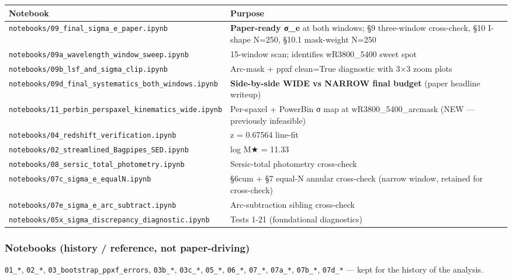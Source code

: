 \documentclass[
  10pt,
]{article}
\begin{document}
\begingroup\small\setlength{\tabcolsep}{4pt}\begin{longtable}[]{@{}ll@{}}
\toprule
Notebook & Purpose \\
\midrule
\endhead
\texttt{notebooks/09\_final\_sigma\_e\_paper.ipynb} & \textbf{Paper-ready σ\_e} at both windows; §9 three-window cross-check, §10 I-shape N=250, §10.1 mask-weight N=250 \\
\texttt{notebooks/09a\_wavelength\_window\_sweep.ipynb} & 15-window scan; identifies wR3800\_5400 sweet spot \\
\texttt{notebooks/09b\_lsf\_and\_sigma\_clip.ipynb} & Arc-mask + ppxf clean=True diagnostic with 3×3 zoom plots \\
\texttt{notebooks/09d\_final\_systematics\_both\_windows.ipynb} & \textbf{Side-by-side WIDE vs NARROW final budget} (paper headline writeup) \\
\texttt{notebooks/11\_perbin\_perspaxel\_kinematics\_wide.ipynb} & Per-spaxel + PowerBin σ map at wR3800\_5400\_arcmask (NEW --- previously infeasible) \\
\texttt{notebooks/04\_redshift\_verification.ipynb} & z = 0.67564 line-fit \\
\texttt{notebooks/02\_streamlined\_Bagpipes\_SED.ipynb} & log M★ = 11.33 \\
\texttt{notebooks/08\_sersic\_total\_photometry.ipynb} & Sersic-total photometry cross-check \\
\texttt{notebooks/07c\_sigma\_e\_equalN.ipynb} & §6cum + §7 equal-N annular cross-check (narrow window, retained for cross-check) \\
\texttt{notebooks/07e\_sigma\_e\_arc\_subtract.ipynb} & Arc-subtraction sibling cross-check \\
\texttt{notebooks/05x\_sigma\_discrepancy\_diagnostic.ipynb} & Tests 1-21 (foundational diagnostics) \\
\bottomrule
\end{longtable}\endgroup

\hypertarget{notebooks-history-reference-not-paper-driving}{%
\subsubsection{Notebooks (history / reference, not paper-driving)}\label{notebooks-history-reference-not-paper-driving}}

\texttt{01\_*}, \texttt{02\_*}, \texttt{03\_bootstrap\_ppxf\_errors}, \texttt{03b\_*}, \texttt{03c\_*}, \texttt{05\_*}, \texttt{06\_*}, \texttt{07\_*}, \texttt{07a\_*}, \texttt{07b\_*},
\texttt{07d\_*} --- kept for the history of the analysis.
\end{document}

